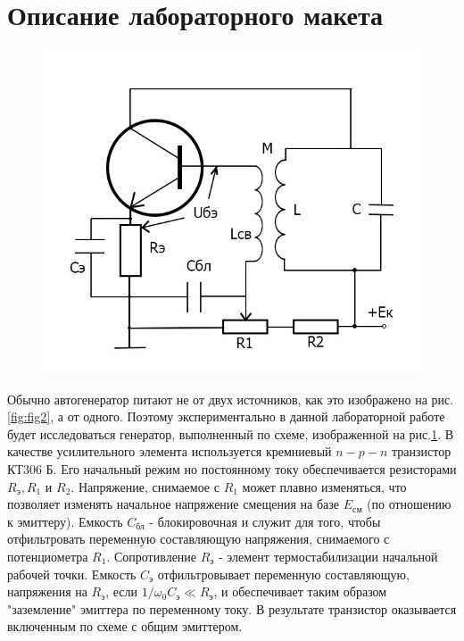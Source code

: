 \section{Описание лабораторного макета}

\begin{figure}
\includegraphics[width=\linewidth]{circuit/fig14}
\caption{}
\label{fig:fig14}
\vspace{-17pt}
\end{figure}

Обычно автогенератор питают не от двух источников, как это изображено на рис.\ref{fig:fig2}, а от одного. Поэтому экспериментально в данной лабораторной работе будет исследоваться генератор, выполненный по схеме, изображенной на рис.\ref{fig:fig14}. В качестве усилительного элемента используется кремниевый $n-p-n$ транзистор КТ306 Б. Его начальный режим но постоянному току обеспечивается резисторами $R_\text{э}, R_1$ и $R_2$. Напряжение, снимаемое с $R_1$ может плавно изменяться, что позволяет изменять начальное напряжение смещения на базе $E_\text{см}$ (по отношению к эмиттеру). Емкость $C_\text{бл}$	- блокировочная и служит для того, чтобы отфильтровать переменную составляющую напряжения, снимаемого с потенциометра $R_1$. Сопротивление $R_\text{э}$ - элемент термостабилизации начальной рабочей точки. Емкость $C_\text{э}$ отфильтровывает переменную составляющую, напряжения на $R_\text{э}$, если $1/\omega_0 C_\text{э}\ll R_\text{э}$, и обеспечивает таким образом "заземление" эмиттера по переменному току. В результате транзистор оказывается включенным по схеме с общим эмиттером.

